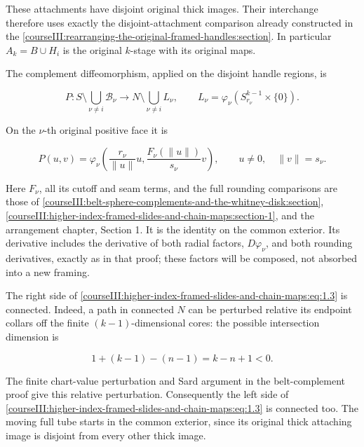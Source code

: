 These attachments have disjoint original thick images. Their interchange therefore uses exactly the disjoint-attachment comparison already constructed in the \cref{courseIII:rearranging-the-original-framed-handles:section}. In particular \(A_k=B\cup H_i\) is the original \(k\)-stage with its original maps.

The complement diffeomorphism, applied on the disjoint handle regions, is

\begin{equation}
P:S\setminus\bigcup_{\nu\ne i}\mathcal B_\nu
   \longrightarrow
 N\setminus\bigcup_{\nu\ne i}L_\nu,\qquad
 L_\nu=\varphi_\nu(S^{k-1}_{r_\nu}\times\{0\}).
 \label{courseIII:higher-index-framed-slides-and-chain-maps:eq:1.3}
\end{equation}

On the \(\nu\)-th original positive face it is

\begin{equation}
P(u,v)=
 \varphi_\nu\left(\frac{r_\nu}{\|u\|}u,
                  \frac{F_\nu(\|u\|)}{s_\nu}v\right),
 \qquad u\ne0,\quad \|v\|=s_\nu .
 \label{courseIII:higher-index-framed-slides-and-chain-maps:eq:1.4}
\end{equation}

Here \(F_\nu\), all its cutoff and seam terms, and the full rounding comparisons are those of \cref{courseIII:belt-sphere-complements-and-the-whitney-disk:section}, \cref{courseIII:higher-index-framed-slides-and-chain-maps:section-1}, and the arrangement chapter, Section 1. It is the identity on the common exterior. Its derivative includes the derivative of both radial factors, \(D\varphi_\nu\), and both rounding derivatives, exactly as in that proof; these factors will be composed, not absorbed into a new framing.

The right side of \eqref{courseIII:higher-index-framed-slides-and-chain-maps:eq:1.3} is connected. Indeed, a path in connected \(N\) can be perturbed relative its endpoint collars off the finite \((k-1)\)-dimensional cores: the possible intersection dimension is

\begin{equation}
1+(k-1)-(n-1)=k-n+1<0.
 \label{courseIII:higher-index-framed-slides-and-chain-maps:eq:1.5}
\end{equation}

The finite chart-value perturbation and Sard argument in the belt-complement proof give this relative perturbation. Consequently the left side of \eqref{courseIII:higher-index-framed-slides-and-chain-maps:eq:1.3} is connected too. The moving full tube starts in the common exterior, since its original thick attaching image is disjoint from every other thick image.

